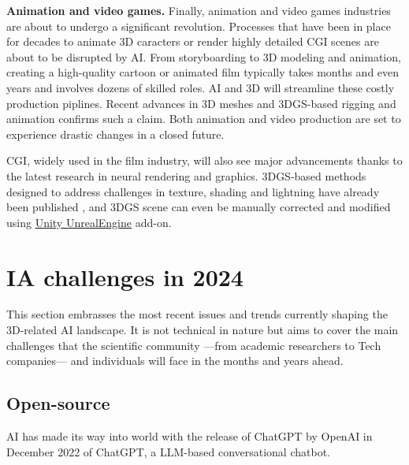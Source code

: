 \noindent \textbf{Animation and video games.} Finally, animation and video games industries are about to undergo a significant revolution. Processes that have been in place for decades to animate 3D caracters or render highly detailed \ac{CGI} scenes are about to be disrupted by \ac{AI}. From storyboarding to 3D modeling and animation, creating a high-quality cartoon or animated film typically takes months and even years and involves dozens of skilled roles. \ac{AI} and 3D will streamline these costly production piplines. Recent advances in 3D meshes and 3D\ac{GS}-based rigging and animation \citep{qian2023gaussianavatars,li2024animatablegaussians} confirms such a claim. Both animation and video production are set to experience drastic changes in a closed future. 

\ac{CGI}, widely used in the film industry, will also see major advancements thanks to the latest research in neural rendering and graphics. 3D\ac{GS}-based methods designed to address challenges in texture, shading and lightning have already been published \citep{jiang2023gaussianshader,wu2024deferredgs}, and 3D\ac{GS} scene can even be manually corrected and modified using \href{https://github.com/aras-p/UnityGaussianSplatting/}{Unity UnrealEngine} add-on. 


\section{IA challenges in 2024}

This section embrasses the most recent issues and trends currently shaping the 3D-related \ac{AI} landscape. It is not technical in nature but aims to cover the main challenges that the scientific community —from academic researchers to Tech companies— and individuals will face in the months and years ahead.

\subsection{Open-source}
\label{sec:conclusion-open}
\ac{AI} has made its way into world with the release of ChatGPT by OpenAI in December 2022 of ChatGPT, a \ac{LLM}-based conversational chatbot. 

